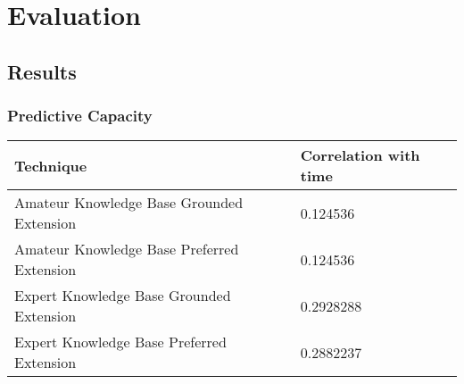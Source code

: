 
\chapter{Evaluation} %

\label{Chapter5} %





\section{Results}



\subsection{Predictive Capacity}



\begin{center}
    \begin{tabular}{ | l | l | }
    \hline
    Technique & Correlation with time\\ \hline
    Amateur Knowledge Base Grounded Extension & 0.124536\\ \hline
    Amateur Knowledge Base Preferred Extension & 0.124536\\ \hline
    Expert Knowledge Base Grounded Extension & 0.2928288\\ \hline
    Expert Knowledge Base Preferred Extension & 0.2882237\\ \hline
    \end{tabular}
\end{center}




